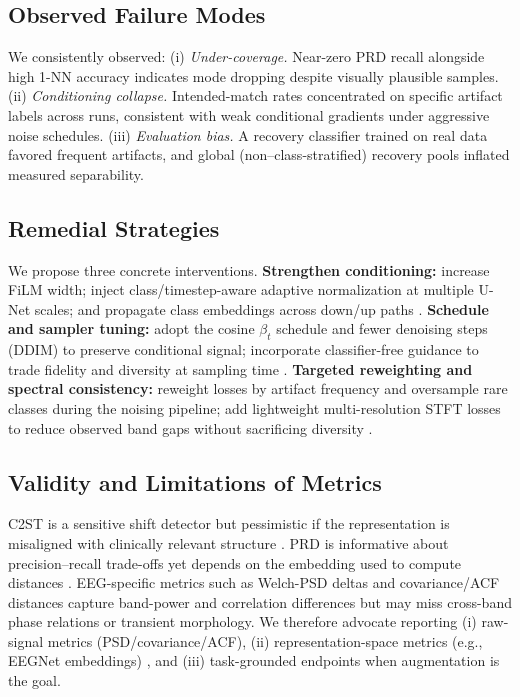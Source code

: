 \documentclass{article}
\begin{document}
\subsection{Observed Failure Modes}
We consistently observed: (i) \emph{Under-coverage.} Near-zero PRD recall alongside high 1-NN accuracy indicates mode dropping despite visually plausible samples. (ii) \emph{Conditioning collapse.} Intended-match rates concentrated on specific artifact labels across runs, consistent with weak conditional gradients under aggressive noise schedules. (iii) \emph{Evaluation bias.} A recovery classifier trained on real data favored frequent artifacts, and global (non–class-stratified) recovery pools inflated measured separability.

\subsection{Remedial Strategies}
We propose three concrete interventions. \textbf{Strengthen conditioning:} increase FiLM width; inject class/timestep-aware adaptive normalization at multiple U-Net scales; and propagate class embeddings across down/up paths \citep{perez2018film}. \textbf{Schedule and sampler tuning:} adopt the cosine $\beta_t$ schedule \citep{nichol2021improved} and fewer denoising steps (DDIM) to preserve conditional signal; incorporate classifier-free guidance to trade fidelity and diversity at sampling time \citep{song2020ddim,ho2022cfg}. \textbf{Targeted reweighting and spectral consistency:} reweight losses by artifact frequency and oversample rare classes during the noising pipeline; add lightweight multi-resolution STFT losses to reduce observed band gaps without sacrificing diversity \citep{yamamoto2020parallelwavegan}.

\subsection{Validity and Limitations of Metrics}
C2ST is a sensitive shift detector but pessimistic if the representation is misaligned with clinically relevant structure \citep{lopezpaz2017c2st}. PRD is informative about precision--recall trade-offs yet depends on the embedding used to compute distances \citep{sajjadi2018prd}. EEG-specific metrics such as Welch-PSD deltas and covariance/ACF distances capture band-power and correlation differences but may miss cross-band phase relations or transient morphology. We therefore advocate reporting (i) raw-signal metrics (PSD/covariance/ACF), (ii) representation-space metrics (e.g., EEGNet embeddings) \citep{lawhern2018eegnet}, and (iii) task-grounded endpoints when augmentation is the goal.
\end{document}

